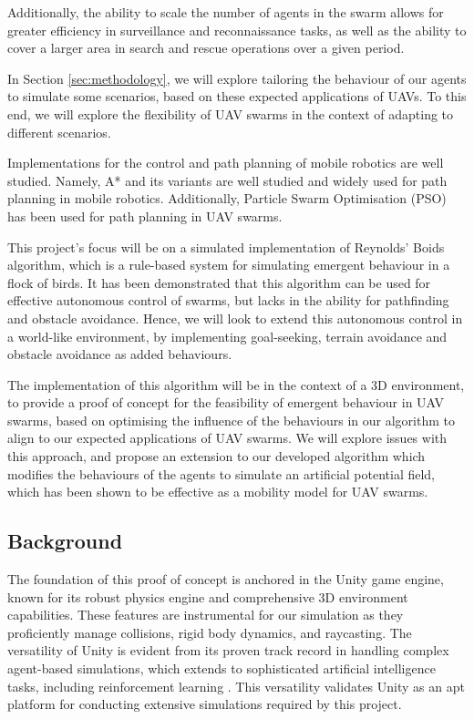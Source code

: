 \documentclass[12pt]{article}
\begin{document}
Additionally, the ability to scale the number of agents in the swarm allows for greater efficiency in surveillance and reconnaissance tasks, as well as the ability to cover a larger area in search and rescue operations over a given period.

In Section \ref{sec:methodology}, we will explore tailoring the behaviour of our agents to simulate some scenarios, based on these expected applications of UAVs. To this end, we will explore the flexibility of UAV swarms in the context of adapting to different scenarios.

Implementations for the control and path planning of mobile robotics are well studied. Namely, A* and its variants are well studied and widely used for path planning in mobile robotics\cite{Chen}. Additionally, Particle Swarm Optimisation (PSO) has been used for path planning in UAV swarms\cite{Pyke}.

This project's focus will be on a simulated implementation of Reynolds' Boids\cite{Reynolds} algorithm, which is a rule-based system for simulating emergent behaviour in a flock of birds. It has been demonstrated that this algorithm can be used for effective autonomous control of swarms\cite{Basu}, but lacks in the ability for pathfinding and obstacle avoidance\cite{Pyke}. Hence, we will look to extend this autonomous control in a world-like environment, by implementing goal-seeking, terrain avoidance and obstacle avoidance as added behaviours.

The implementation of this algorithm will be in the context of a 3D environment, to provide a proof of concept for the feasibility of emergent behaviour in UAV swarms, based on optimising the influence of the behaviours in our algorithm to align to our expected applications of UAV swarms. We will explore issues with this approach, and propose an extension to our developed algorithm which modifies the behaviours of the agents to simulate an artificial potential field, which has been shown to be effective as a mobility model for UAV swarms\cite{Falomir}.

\subsection{Background}

The foundation of this proof of concept is anchored in the Unity game engine, known for its robust physics engine and comprehensive 3D environment capabilities. These features are instrumental for our simulation as they proficiently manage collisions, rigid body dynamics, and raycasting. The versatility of Unity is evident from its proven track record in handling complex agent-based simulations, which extends to sophisticated artificial intelligence tasks, including reinforcement learning \cite{juliani2020unity}. This versatility validates Unity as an apt platform for conducting extensive simulations required by this project.
\end{document}
